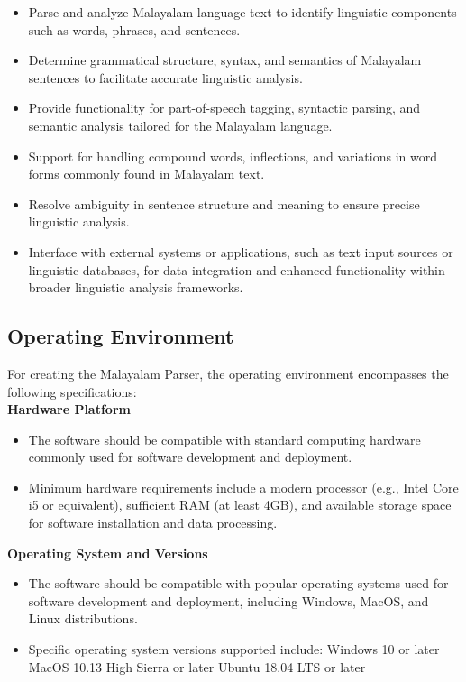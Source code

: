 \documentclass[12pt]{article}
\begin{document}
	\begin{itemize}[label=-]
		\item Parse and analyze Malayalam language text to identify linguistic components such as
		words, phrases, and sentences.
		\item Determine grammatical structure, syntax, and semantics of Malayalam sentences to
		facilitate accurate linguistic analysis.
		\item Provide functionality for part-of-speech tagging, syntactic parsing, and semantic
		analysis tailored for the Malayalam language.
		\item Support for handling compound words, inflections, and variations in word forms
		commonly found in Malayalam text.
		\item Resolve ambiguity in sentence structure and meaning to ensure precise linguistic
		analysis.
		\item Interface with external systems or applications, such as text input sources or linguistic
		databases, for data integration and enhanced functionality within broader linguistic
		analysis frameworks.
	\end{itemize}

	\subsection{Operating Environment}
	For creating the Malayalam Parser, the operating environment encompasses the following
	specifications:\\
	\textbf{Hardware Platform}
	
	\begin{itemize}[label=-]
		\item The software should be compatible with standard computing hardware commonly
		used for software development and deployment.
		\item Minimum hardware requirements include a modern processor (e.g., Intel Core i5 or
		equivalent), sufficient RAM (at least 4GB), and available storage space for software
		installation and data processing.
	\end{itemize}

	\textbf{Operating System and Versions}
	
	\begin{itemize}[label=-]
		\item The software should be compatible with popular operating systems used for
		software development and deployment, including Windows, MacOS, and Linux
		distributions.
		\item Specific operating system versions supported include:
		\subitem Windows 10 or later
		\subitem MacOS 10.13 High Sierra or later
		\subitem Ubuntu 18.04 LTS or later
	\end{itemize}
	
\end{document}
